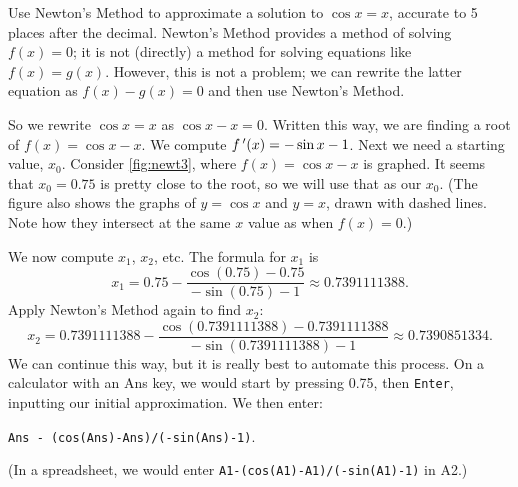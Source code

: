\begin{example}\label{ex_newt3}%
Use Newton's Method to approximate a solution to $\cos x=x$, accurate to 5 places after the decimal.
\solution
Newton's Method provides a method of solving $f(x) = 0$; it is not (directly) a method for solving equations like $f(x) = g(x)$. However, this is not a problem; we can rewrite the latter equation as $f(x) - g(x)=0$ and then use Newton's Method. 

So we rewrite $\cos x=x$ as $\cos{x}-x=0$.  Written this way, we are finding a root of $f(x)=\cos{x}-x$.  We compute $f\,'(x)=-\sin{x} - 1$.  Next we need a starting value, $x_0$.  Consider \autoref{fig:newt3}, where $f(x) = \cos x-x$ is graphed. It seems that $x_0=0.75$ is pretty close to the root, so we will use that as our $x_0$. (The figure also shows the graphs of $y=\cos x$ and $y=x$, drawn with dashed lines. Note how they intersect at the same $x$ value as when $f(x) = 0$.)


We now compute $x_1$, $x_2$, etc.  The formula for $x_1$ is 
\[x_1 = 0.75 - \frac{\cos(0.75)-0.75}{-\sin(0.75)-1}\approx 0.7391111388.\]
Apply Newton's Method again to find $x_2$:
\[x_2 = 0.7391111388 - \frac{\cos(0.7391111388)-0.7391111388}{-\sin(0.7391111388)-1}\approx 0.7390851334.\]
We can continue this way, but it is really best to automate this process.  On a calculator with an Ans key, we would start by pressing 0.75, then \texttt{Enter}, inputting our initial approximation. We then enter:
\begin{center}\texttt{Ans - (cos(Ans)-Ans)/(-sin(Ans)-1)}.\end{center}
(In a spreadsheet, we would enter \texttt{A1-(cos(A1)-A1)/(-sin(A1)-1)} in A2.)


\end{example}
